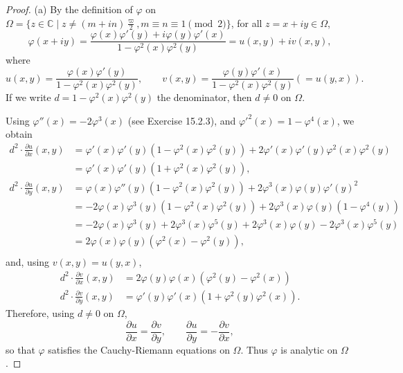 \documentclass[11pt,a4paper]{article}
\newcommand{\C}{\mathbb{C}}
\begin{document}
\begin{proof} 
\item[(a)] By the definition of $\varphi$ on $\Omega = \{z \in \C \mid z \ne (m+in)\frac{\varpi}{2}, m\equiv n \equiv 1 \pmod 2\}$, for all $z = x+iy \in \Omega$,
$$\varphi(x+iy) = \frac{\varphi(x) \varphi'(y) + i \varphi(y) \varphi'(x)}{1 - \varphi^2(x) \varphi^2(y)}=u(x,y) + i v(x,y) ,$$
where
$$u(x,y) = \frac{\varphi(x) \varphi'(y)}{1 - \varphi^2(x) \varphi^2(y)},\qquad v(x,y) =  \frac{\varphi(y) \varphi'(x)}{1 - \varphi^2(x) \varphi^2(y)} (= u(y,x)).$$
If we write $d = 1 - \varphi^2(x) \varphi^2(y)$ the denominator, then $d \ne 0$ on $\Omega$. 

Using $\varphi''(x) = -2 \varphi^3(x)$ (see Exercise 15.2.3),  and $\varphi'^2(x) = 1 - \varphi^4(x)$, we obtain
\begin{align*}
d^2\cdot  \frac{\partial u}{\partial x}(x,y) &= \varphi'(x) \varphi'(y) \left(1 - \varphi^2(x) \varphi^2(y)\right) + 2 \varphi'(x) \varphi'(y) \varphi^2(x) \varphi^2(y)\\
&= \varphi'(x) \varphi'(y) \left( 1 + \varphi^2(x) \varphi^2(y)\right),\\
d^2\cdot  \frac{\partial u}{\partial y}(x,y) &= \varphi(x) \varphi''(y)\left (1 - \varphi^2(x) \varphi^2(y) \right) + 2 \varphi^3(x) \varphi(y) \varphi'(y)^2\\
&=-2\varphi(x) \varphi^3(y)\left (1 - \varphi^2(x) \varphi^2(y) \right) +2 \varphi^3(x) \varphi(y)\left(1 - \varphi^4(y)\right)  \\
&=  -2\varphi(x) \varphi^3(y) + 2 \varphi^3(x) \varphi^5(y) + 2 \varphi^3(x) \varphi(y) - 2 \varphi^3(x) \varphi^5(y)\\
&=  2 \varphi(x) \varphi(y) (\varphi^2(x) - \varphi^2(y)),\\
\end{align*}
and, using $v(x,y) = u(y,x)$,
\begin{align*}
d^2\cdot  \frac{\partial v}{\partial x}(x,y)  &= 2 \varphi(y) \varphi(x) (\varphi^2(y) - \varphi^2(x))\\
d^2\cdot  \frac{\partial v}{\partial y}(x,y)  &= \varphi'(y) \varphi'(x) \left( 1 + \varphi^2(y) \varphi^2(x)\right).
\end{align*}
Therefore, using $d\ne 0$ on $\Omega$,
$$ \frac{\partial u}{\partial x} =  \frac{\partial v}{\partial y},\qquad  \frac{\partial u}{\partial y} = -  \frac{\partial v}{\partial x},$$
so that $\varphi$ satisfies the Cauchy-Riemann equations on $\Omega$. Thus $\varphi$ is analytic on $\Omega$.


\end{proof}
\end{document}
